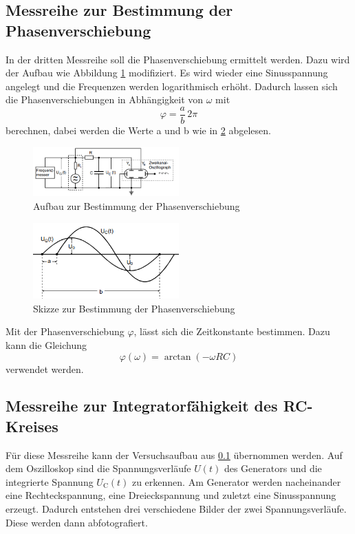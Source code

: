 \subsection{Messreihe zur Bestimmung der Phasenverschiebung}
\label{subsec:Phase}
In der dritten Messreihe soll die Phasenverschiebung ermittelt werden. Dazu wird der Aufbau wie Abbildung \ref{fig:aufbauphi} modifiziert.
Es wird wieder eine Sinusspannung angelegt und die Frequenzen werden logarithmisch erhöht.
Dadurch lassen sich die Phasenverschiebungen in Abhängigkeit von $\omega$ mit
\begin{equation}
    \varphi=\frac{a}{b} \, 2 \pi
\end{equation}
berechnen, dabei werden die Werte a und b wie in \ref{fig:wertphi} abgelesen.
\begin{figure}
    \centering
    \caption{Aufbau zur Bestimmung der Phasenverschiebung} 
    \label{fig:aufbauphi}
    \includegraphics[width = 0.5\textwidth]{pics/phasenverschiebung.png}
\end{figure}
\begin{figure}
    \centering
    \caption{Skizze zur Bestimmung der Phasenverschiebung} 
    \label{fig:wertphi}
    \includegraphics[width = 0.5\textwidth]{pics/werteabl.png}
\end{figure}
Mit der Phasenverschiebung $\varphi$, lässt sich die Zeitkonstante bestimmen. Dazu kann die Gleichung
\begin{equation}
    \label{eqn:ficken}
    \varphi (\omega)=\arctan (-\omega RC)
\end{equation}
verwendet werden.
\subsection{Messreihe zur Integratorfähigkeit des RC-Kreises}
Für diese Messreihe kann der Versuchsaufbau aus \ref{subsec:Phase} übernommen werden.
Auf dem Oszilloskop sind die Spannungsverläufe $U(t)$ des Generators und die integrierte Spannung $U_\text{C}(t)$ zu erkennen.
Am Generator werden nacheinander eine Rechteckspannung, eine Dreieckspannung und zuletzt eine Sinusspannung erzeugt.
Dadurch entstehen drei verschiedene Bilder der zwei Spannungsverläufe. Diese werden dann abfotografiert. 